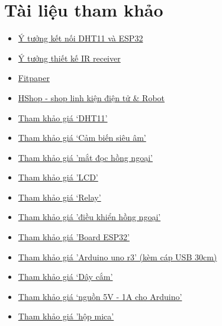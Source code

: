 \documentclass{report}
\begin{document}
\section{Tài liệu tham khảo}
\begin{itemize}
    \item 
    \href{https://www.youtube.com/watch?v=eODatazcbaw}{Ý tưởng kết nối DHT11 và ESP32}

    \item
    \href{https://wokwi.com/projects/300028989690348041}{Ý tưởng thiết kế IR receiver}
    
    \item \href{https://tex.stackexchange.com/questions/125135/insert-pages-from-a-pdf-file-to-fit-at-the-entire-page-using-includepdf}{Fitpaper}

    \item \href{https://hshop.vn}{HShop - shop linh kiện điện tử \& Robot}

    \item \href{https://hshop.vn/products/cam-bien-do-am-nhiet-do-dht11-ra-chan}{Tham khảo giá `DHT11'}
    \item \href{https://hshop.vn/products/cam-bien-sieu-am-srf04}{Tham khảo giá `Cảm biến siêu âm'}
    \item \href{https://hshop.vn/products/mat-thu-hong-ngoai-1838}{Tham khảo giá 'mắt đọc hồng ngoại'}
    \item \href{https://hshop.vn/products/lcd-text-lcd1602-xanh-duong}{Tham khảo giá 'LCD'}
    \item \href{https://hshop.vn/products/mach-relay-tre-ic555}{Tham khảo giá `Relay'}
    \item \href{https://hshop.vn/products/dieu-khien-hong-ngoai-ir-remote-control-38khz}{Tham khảo giá 'điều khiển hồng ngoại'}
    \item \href{https://hshop.vn/products/kit-rf-thu-phat-wifi-ble-esp32-s2-nodemcu-32-s2-ai-thinker}{Tham khảo giá 'Board ESP32'}

    \item \href{https://hshop.vn/products/arduino-uno-r3}{Tham khảo giá 'Arduino uno r3' (kèm cáp USB 30cm)}
    \item \href{https://hshop.vn/search?type=product&q=dây%20cắm}{Tham khảo giá `Dây cắm'}
    \item \href{https://dientutuonglai.com/nguon-adapter-5v1a-dau-ra-day-nguon-usb-va-dc5-5.html}{Tham khảo giá `nguồn 5V - 1A cho Arduino'}

    \item \href{https://shp.ee/zau4d86}{Tham khảo giá 'hộp mica'}
    
\end{itemize}
\end{document}
